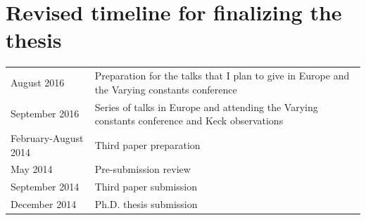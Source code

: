 \documentclass[useAMS,usenatbib,onecolumn]{mnras}
\begin{document}
\section{Revised timeline for finalizing the thesis}
\label{sec:timeline}

\begin{tabular*}{0.75\textwidth}{ l l }
  August 2016                  & Preparation for the talks that I plan to give in Europe and the Varying constants conference \\
  September 2016                & Series of talks in Europe and attending the Varying constants conference and Keck observations \\
  February-August 2014              & Third paper preparation \\
  May 2014                  & Pre-submission review \\
  September 2014              & Third paper submission \\
  December 2014               & Ph.D. thesis submission \\
\end{tabular*}



\begin{multicols}{2}
	
	{\footnotesize
	\setlength{\itemsep}{1pt}
	\begin{spacing}{0.5}
		{}
	\end{spacing}	}
\end{multicols}
\end{document}
